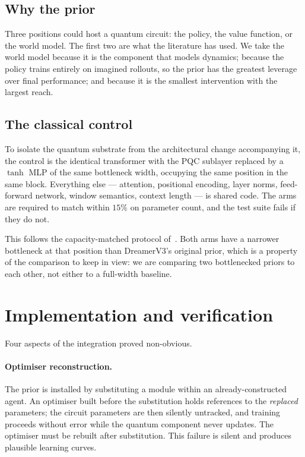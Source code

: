 \documentclass[11pt]{article}
\begin{document}
\subsection{Why the prior}
Three positions could host a quantum circuit: the policy, the value
function, or the world model. The first two are what the literature has
used. We take the world model because it is the component that models
dynamics; because the policy trains entirely on imagined rollouts, so
the prior has the greatest leverage over final performance; and because
it is the smallest intervention with the largest reach.

\subsection{The classical control}
To isolate the quantum substrate from the architectural change
accompanying it, the control is the identical transformer with the PQC
sublayer replaced by a $\tanh$ MLP of the same bottleneck width,
occupying the same position in the same block. Everything else ---
attention, positional encoding, layer norms, feed-forward network,
window semantics, context length --- is shared code. The arms are
required to match within $15\%$ on parameter count, and the test suite
fails if they do not.

This follows the capacity-matched protocol of~\cite{qasa}. Both arms
have a narrower bottleneck at that position than DreamerV3's original
prior, which is a property of the comparison to keep in view: we are
comparing two bottlenecked priors to each other, not either to a
full-width baseline.

\section{Implementation and verification}\label{sec:impl}
Four aspects of the integration proved non-obvious.

\paragraph{Optimiser reconstruction.} The prior is installed by
substituting a module within an already-constructed agent. An optimiser
built before the substitution holds references to the \emph{replaced}
parameters; the circuit parameters are then silently untracked, and
training proceeds without error while the quantum component never
updates. The optimiser must be rebuilt after substitution. This failure
is silent and produces plausible learning curves.
\end{document}
